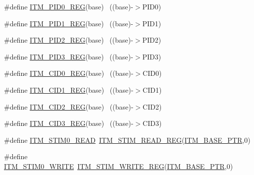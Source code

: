 \begin{DoxyCompactItemize}
\#define \hyperlink{group___i_t_m___register___accessor___macros_ga77332c9b64d98cdd7229a6e1953f6a33}{I\+T\+M\+\_\+\+P\+I\+D0\+\_\+\+R\+EG}(base)                                          ~((base)-\/$>$P\+I\+D0)
\item 
\#define \hyperlink{group___i_t_m___register___accessor___macros_gabd8e07732053603e273fa17f9d125ebe}{I\+T\+M\+\_\+\+P\+I\+D1\+\_\+\+R\+EG}(base)                                          ~((base)-\/$>$P\+I\+D1)
\item 
\#define \hyperlink{group___i_t_m___register___accessor___macros_gaf1651b0bd0b4631207e3437f8cfaddaa}{I\+T\+M\+\_\+\+P\+I\+D2\+\_\+\+R\+EG}(base)                                          ~((base)-\/$>$P\+I\+D2)
\item 
\#define \hyperlink{group___i_t_m___register___accessor___macros_ga4f8b157b66d8df5fcaf166f56cf1fee1}{I\+T\+M\+\_\+\+P\+I\+D3\+\_\+\+R\+EG}(base)                                          ~((base)-\/$>$P\+I\+D3)
\item 
\#define \hyperlink{group___i_t_m___register___accessor___macros_ga0c80f56059755478a7d1bc62ef67a9e3}{I\+T\+M\+\_\+\+C\+I\+D0\+\_\+\+R\+EG}(base)                                          ~((base)-\/$>$C\+I\+D0)
\item 
\#define \hyperlink{group___i_t_m___register___accessor___macros_ga68959e3c73327037ca6c037197dc655e}{I\+T\+M\+\_\+\+C\+I\+D1\+\_\+\+R\+EG}(base)                                          ~((base)-\/$>$C\+I\+D1)
\item 
\#define \hyperlink{group___i_t_m___register___accessor___macros_ga5ea3ee7db440781e970bf3eb97d55673}{I\+T\+M\+\_\+\+C\+I\+D2\+\_\+\+R\+EG}(base)                                          ~((base)-\/$>$C\+I\+D2)
\item 
\#define \hyperlink{group___i_t_m___register___accessor___macros_gade0a6ba9d22485697b0889409b4cc976}{I\+T\+M\+\_\+\+C\+I\+D3\+\_\+\+R\+EG}(base)                                          ~((base)-\/$>$C\+I\+D3)
\item 
\#define \hyperlink{group___i_t_m___register___accessor___macros_ga41eefae93b44a2616fd9feac9188bd5b}{I\+T\+M\+\_\+\+S\+T\+I\+M0\+\_\+\+R\+E\+AD}~\hyperlink{group___i_t_m___register___accessor___macros_ga5009882336aadcd4f37b45cf3395c450}{I\+T\+M\+\_\+\+S\+T\+I\+M\+\_\+\+R\+E\+A\+D\+\_\+\+R\+EG}(\hyperlink{group___i_t_m___peripheral_gafaddee8fe8b6a898d4e5edc43ee0d703}{I\+T\+M\+\_\+\+B\+A\+S\+E\+\_\+\+P\+TR},0)
\item 
\#define \hyperlink{group___i_t_m___register___accessor___macros_gac29b16f3533cac91bfa55b3ed6a9e14d}{I\+T\+M\+\_\+\+S\+T\+I\+M0\+\_\+\+W\+R\+I\+TE}~\hyperlink{group___i_t_m___register___accessor___macros_ga049ca92a4e78e77c19af81e51aa73f1c}{I\+T\+M\+\_\+\+S\+T\+I\+M\+\_\+\+W\+R\+I\+T\+E\+\_\+\+R\+EG}(\hyperlink{group___i_t_m___peripheral_gafaddee8fe8b6a898d4e5edc43ee0d703}{I\+T\+M\+\_\+\+B\+A\+S\+E\+\_\+\+P\+TR},0)

\end{DoxyCompactItemize}
